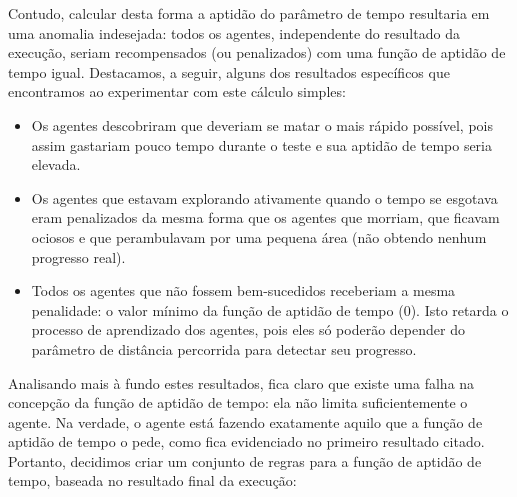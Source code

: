 Contudo, calcular desta forma a aptidão do parâmetro de tempo resultaria em uma
anomalia indesejada: todos os agentes, independente do resultado da execução,
seriam recompensados (ou penalizados) com uma função de aptidão de tempo igual.
Destacamos, a seguir, alguns dos resultados específicos que encontramos ao
experimentar com este cálculo simples:

\begin{itemize}
	\item Os agentes descobriram que deveriam se matar o mais rápido possível,
		pois assim gastariam pouco tempo durante o teste e sua aptidão de tempo
		seria elevada.

	\item Os agentes que estavam explorando ativamente quando o tempo se
		esgotava eram penalizados da mesma forma que os agentes que morriam, que
		ficavam ociosos e que perambulavam por uma pequena área (não obtendo
		nenhum progresso real).

	\item Todos os agentes que não fossem bem-sucedidos receberiam a mesma
		penalidade: o valor mínimo da função de aptidão de tempo ($0$). Isto
		retarda o processo de aprendizado dos agentes, pois eles só poderão
		depender do parâmetro de distância percorrida para detectar seu
		progresso.
\end{itemize}

Analisando mais à fundo estes resultados, fica claro que existe uma falha na
concepção da função de aptidão de tempo: ela não limita suficientemente o
agente. Na verdade, o agente está fazendo exatamente aquilo que a função de
aptidão de tempo o pede, como fica evidenciado no primeiro resultado citado.
Portanto, decidimos criar um conjunto de regras para a função de aptidão de
tempo, baseada no resultado final da execução:

